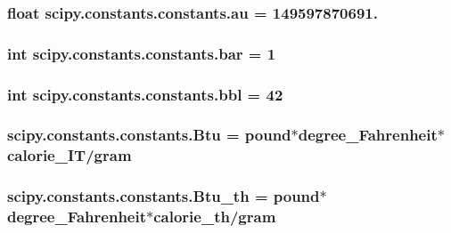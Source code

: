 \subsubsection[{au}]{\setlength{\rightskip}{0pt plus 5cm}float scipy.\+constants.\+constants.\+au = 149597870691.}\label{namespacescipy_1_1constants_1_1constants_a69a382398c7f6bd661510dd3a046ceca}
\hypertarget{namespacescipy_1_1constants_1_1constants_a7f07f93ed5fe114bca94918b569a2686}{}
\subsubsection[{bar}]{\setlength{\rightskip}{0pt plus 5cm}int scipy.\+constants.\+constants.\+bar = 1}\label{namespacescipy_1_1constants_1_1constants_a7f07f93ed5fe114bca94918b569a2686}
\hypertarget{namespacescipy_1_1constants_1_1constants_a429078b9781ed22855d32d48ffd07dd0}{}
\subsubsection[{bbl}]{\setlength{\rightskip}{0pt plus 5cm}int scipy.\+constants.\+constants.\+bbl = 42}\label{namespacescipy_1_1constants_1_1constants_a429078b9781ed22855d32d48ffd07dd0}
\hypertarget{namespacescipy_1_1constants_1_1constants_a373d6a4dda3fc744b13c25470c305ba7}{}
\subsubsection[{Btu}]{\setlength{\rightskip}{0pt plus 5cm}scipy.\+constants.\+constants.\+Btu = pound$\ast${\bf degree\+\_\+\+Fahrenheit}$\ast${\bf calorie\+\_\+\+I\+T}/{\bf gram}}\label{namespacescipy_1_1constants_1_1constants_a373d6a4dda3fc744b13c25470c305ba7}
\hypertarget{namespacescipy_1_1constants_1_1constants_a30c4a0fb2ab61d884bb2e6fa8c0b98a8}{}
\subsubsection[{Btu\+\_\+th}]{\setlength{\rightskip}{0pt plus 5cm}scipy.\+constants.\+constants.\+Btu\+\_\+th = pound$\ast${\bf degree\+\_\+\+Fahrenheit}$\ast$calorie\+\_\+th/{\bf gram}}\label{namespacescipy_1_1constants_1_1constants_a30c4a0fb2ab61d884bb2e6fa8c0b98a8}
\hypertarget{namespacescipy_1_1constants_1_1constants_aac0929e32a49dd3a9100b7545599d2f3}{}

